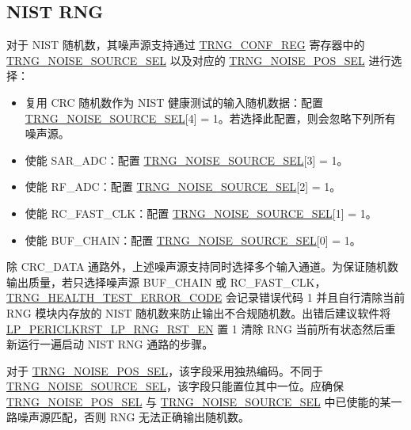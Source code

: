 \documentclass[main\_\_CN.tex]{subfiles}
\begin{document}
\subsection{NIST RNG}\label{sec:rng-nist-rng}

对于 NIST 随机数，其噪声源支持通过 \hyperref[regdesc:TRNGCONFREG]{TRNG\_CONF\_REG} 寄存器中的 \hyperref[fielddesc:TRNGNOISESOURCESEL]{TRNG\_NOISE\_SOURCE\_SEL} 以及对应的 \hyperref[fielddesc:TRNGNOISEPOSSEL]{TRNG\_NOISE\_POS\_SEL} 进行选择：
\begin{itemize}
    \item 复用 CRC 随机数作为 NIST 健康测试的输入随机数据：配置 \hyperref[fielddesc:TRNGNOISESOURCESEL]{TRNG\_NOISE\_SOURCE\_SEL}[4] = 1。若选择此配置，则会忽略下列所有噪声源。
    \item 使能 SAR\_ADC：配置 \hyperref[fielddesc:TRNGNOISESOURCESEL]{TRNG\_NOISE\_SOURCE\_SEL}[3] = 1。
    \item 使能 RF\_ADC：配置 \hyperref[fielddesc:TRNGNOISESOURCESEL]{TRNG\_NOISE\_SOURCE\_SEL}[2] = 1。
    \item 使能 RC\_FAST\_CLK：配置 \hyperref[fielddesc:TRNGNOISESOURCESEL]{TRNG\_NOISE\_SOURCE\_SEL}[1] = 1。
    \item 使能 BUF\_CHAIN：配置 \hyperref[fielddesc:TRNGNOISESOURCESEL]{TRNG\_NOISE\_SOURCE\_SEL}[0] = 1。
\end{itemize}
除 CRC\_DATA 通路外，上述噪声源支持同时选择多个输入通道。为保证随机数输出质量，若只选择噪声源 BUF\_CHAIN 或 RC\_FAST\_CLK，\hyperref[fielddesc:TRNGHEALTHTESTERRORCODE]{TRNG\_HEALTH\_TEST\_ERROR\_CODE} 会记录错误代码 1 并且自行清除当前 RNG 模块内存放的 NIST 随机数来防止输出不合规随机数。出错后建议软件将 \hyperref[fielddesc:LPPERICLKRSTLPRNGRSTEN]{LP\_PERICLKRST\_LP\_RNG\_RST\_EN} 置 1 清除 RNG 当前所有状态然后重新运行一遍启动 NIST RNG 通路的步骤。

对于 \hyperref[fielddesc:TRNGNOISEPOSSEL]{TRNG\_NOISE\_POS\_SEL}，该字段采用独热编码。不同于 \hyperref[fielddesc:TRNGNOISESOURCESEL]{TRNG\_NOISE\_SOURCE\_SEL}，该字段只能置位其中一位。应确保 \hyperref[fielddesc:TRNGNOISEPOSSEL]{TRNG\_NOISE\_POS\_SEL} 与 \hyperref[fielddesc:TRNGNOISESOURCESEL]{TRNG\_NOISE\_SOURCE\_SEL} 中已使能的某一路噪声源匹配，否则 RNG 无法正确输出随机数。
\end{document}
